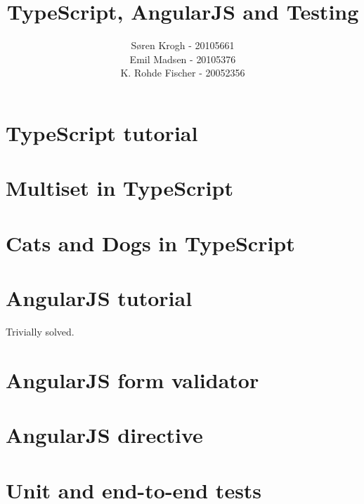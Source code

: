 \documentclass[a4paper,10pt]{article}
\title{TypeScript, AngularJS and Testing}
\author{Søren Krogh -  20105661 \\
Emil Madsen - 20105376  \\
K. Rohde Fischer - 20052356\\}
\begin{document}
\maketitle

\section*{TypeScript tutorial}


\section*{Multiset in TypeScript}


\section*{Cats and Dogs in TypeScript}


\section*{AngularJS tutorial}
Trivially solved.

\section*{AngularJS form validator}


\section*{AngularJS directive}


\section*{Unit and end-to-end tests}

\end{document}
